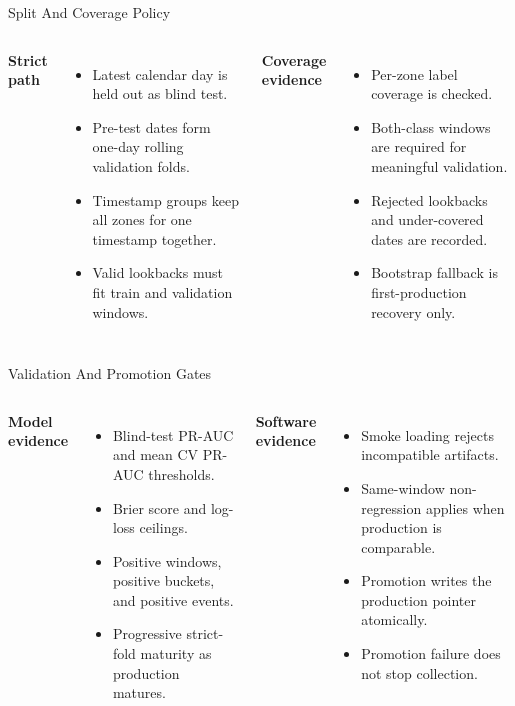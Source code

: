 \documentclass[aspectratio=169]{beamer}
\begin{document}
\begin{frame}[shrink=4]{Split And Coverage Policy}
\begin{columns}[T,onlytextwidth]
\textbf{Strict path}
\begin{itemize}
  \item Latest calendar day is held out as blind test.
  \item Pre-test dates form one-day rolling validation folds.
  \item Timestamp groups keep all zones for one timestamp together.
  \item Valid lookbacks must fit train and validation windows.
\end{itemize}

\textbf{Coverage evidence}
\begin{itemize}
  \item Per-zone label coverage is checked.
  \item Both-class windows are required for meaningful validation.
  \item Rejected lookbacks and under-covered dates are recorded.
  \item Bootstrap fallback is first-production recovery only.
\end{itemize}
\end{columns}
\tightsep
\begin{center}
\hspace{0.45em}
\hspace{0.45em}
\hspace{0.45em}
\end{center}
\end{frame}

\begin{frame}[shrink=4]{Validation And Promotion Gates}
\begin{columns}[T,onlytextwidth]
\textbf{Model evidence}
\begin{itemize}
  \item Blind-test PR-AUC and mean CV PR-AUC thresholds.
  \item Brier score and log-loss ceilings.
  \item Positive windows, positive buckets, and positive events.
  \item Progressive strict-fold maturity as production matures.
\end{itemize}

\textbf{Software evidence}
\begin{itemize}
  \item Smoke loading rejects incompatible artifacts.
  \item Same-window non-regression applies when production is comparable.
  \item Promotion writes the production pointer atomically.
  \item Promotion failure does not stop collection.
\end{itemize}
\end{columns}
\end{frame}
\end{document}
